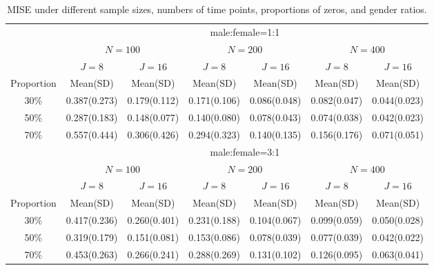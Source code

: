 \begin{table}[htbp]
\footnotesize
\begin{center}
\caption{MISE under different sample sizes, numbers of time
points, proportions of zeros, and gender ratios.}
\begin{tabular}{c|cc|cc|cc}
 
&\multicolumn{6}{c}{male:female=1:1}\\ 
& \multicolumn{2}{c|}{$N=100$}& \multicolumn{2}{c|}{$N=200$}& \multicolumn{2}{c}{$N=400$}\\
&$J=8$&$J=16$&$J=8$&$J=16$&$J=8$&$J=16$\\
 Proportion & Mean(SD) & Mean(SD) & Mean(SD) & Mean(SD) &
Mean(SD) & Mean(SD)\\
 30\%&0.387(0.273) &
0.179(0.112)&0.171(0.106) &0.086(0.048) &0.082(0.047) &
0.044(0.023)       \\ 
50\% & 0.287(0.183)        & 0.148(0.077)         &  0.140(0.080)        &   0.078(0.043)       &   0.074(0.038)       & 0.042(0.023)         \\
70\% &  0.557(0.444)       &   0.306(0.426)       &  0.294(0.323)        &  0.140(0.135)        &  0.156(0.176)        & 0.071(0.051)    \\
 &\multicolumn{6}{c}{male:female=3:1}\\ 
& \multicolumn{2}{c|}{$N=100$}& \multicolumn{2}{c|}{$N=200$}& \multicolumn{2}{c}{$N=400$}\\

&$J=8$&$J=16$&$J=8$&$J=16$&$J=8$&$J=16$\\
 Proportion & Mean(SD) & Mean(SD) & Mean(SD) & Mean(SD) &
Mean(SD) & Mean(SD)\\
 
 30\%&0.417(0.236) &0.260(0.401)&0.231(0.188) &0.104(0.067) &0.099(0.059) &0.050(0.028)       \\
50\% & 0.319(0.179)        & 0.151(0.081)         &  0.153(0.086)        &   0.078(0.039)       &   0.077(0.039)       & 0.042(0.022)         \\
70\% &  0.453(0.263)       &   0.266(0.241)       &  0.288(0.269)        &  0.131(0.102)        &  0.126(0.095)        & 0.063(0.041)    \\

\end{tabular}
\end{center}
\normalsize
\end{table}




